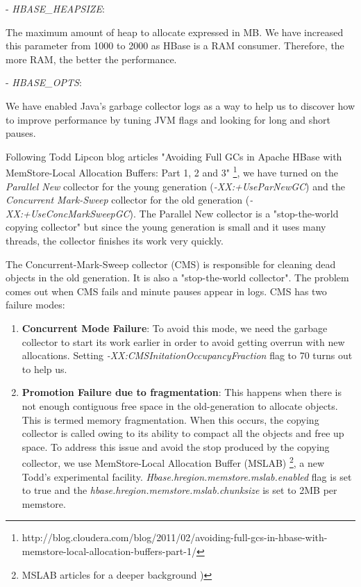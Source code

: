\begin{enumerate}
- \textit{HBASE\_HEAPSIZE}: 
\par
The maximum amount of heap to allocate expressed in MB. We have increased this parameter from 1000 to 2000 as HBase is a RAM consumer. Therefore, the more RAM, the better the performance.
\par
- \textit{HBASE\_OPTS}:
\par
We have enabled Java's garbage collector logs as a way to help us to discover how to improve performance by tuning JVM flags and looking for long and short pauses. 
\par
Following Todd Lipcon blog articles "Avoiding Full GCs in Apache HBase with MemStore-Local Allocation Buffers: Part 1, 2 and 3" \footnote{http://blog.cloudera.com/blog/2011/02/avoiding-full-gcs-in-hbase-with-memstore-local-allocation-buffers-part-1/}, we have turned on the \textit{Parallel New} collector for the young generation (\textit{-XX:+UseParNewGC}) and the \textit{Concurrent Mark-Sweep} collector for the old generation (\textit{-XX:+UseConcMarkSweepGC}). The Parallel New collector is a "stop-the-world copying collector" but since the young generation is small and it uses many threads, the collector finishes its work very quickly.
\par
The Concurrent-Mark-Sweep collector (CMS) is responsible for cleaning dead objects in the old generation. It is also a "stop-the-world collector". The problem comes out when CMS fails and minute pauses appear in logs. CMS has two failure modes:
\begin{enumerate}
\item \textbf{Concurrent Mode Failure}: To avoid this mode, we need the garbage collector to start its work earlier in order to avoid getting overrun with new allocations. Setting \textit{-XX:CMSInitationOccupancyFraction} flag to 70 turns out to help us.
\item \textbf{Promotion Failure due to fragmentation}: This happens when there is not enough contiguous free space in the old-generation to allocate objects. This is termed memory fragmentation. When this occurs, the copying collector is called owing to its ability to compact all the objects and free up space. To address this issue and avoid the stop produced by the copying collector, we use MemStore-Local Allocation Buffer (MSLAB) \footnote{MSLAB articles for a deeper background \cite{ApacheHBaseMSLAB} \cite{MSLAB})}, a new Todd's experimental facility.  \textit{Hbase.hregion.memstore.mslab.enabled} flag is set to true and the \textit{hbase.hregion.memstore.mslab.chunksize} is set to 2MB per memstore.


\end{enumerate}
\end{enumerate}
